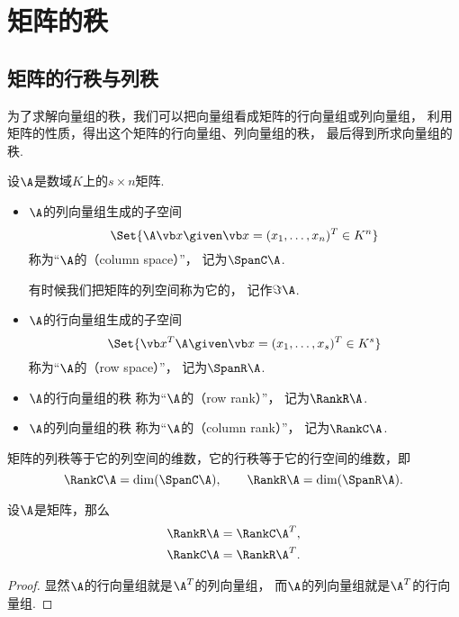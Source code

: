 \section{矩阵的秩}
\subsection{矩阵的行秩与列秩}
为了求解向量组的秩，我们可以把向量组看成矩阵的行向量组或列向量组，
利用矩阵的性质，得出这个矩阵的行向量组、列向量组的秩，
最后得到所求向量组的秩.

\begin{definition}\label{definition:线性方程组.行秩与列秩的定义}
设\(\A\)是数域\(K\)上的\(s \times n\)矩阵.
\begin{itemize}
	\item \(\A\)的列向量组生成的子空间\[
		\Set{
			\A\x \given \x=(x_1,\dotsc,x_n)^T \in K^n
		}
	\]
	称为“\(\A\)的（column space）”，
	记为\(\SpanC\A\).

	有时候我们把矩阵的列空间称为它的，
	记作\(\Im\A\).

	\item \(\A\)的行向量组生成的子空间\[
		\Set{
			\x^T\A \given \x=(x_1,\dotsc,x_s)^T \in K^s
		}
	\]
	称为“\(\A\)的（row space）”，
	记为\(\SpanR\A\).

	\item \(\A\)的行向量组的秩
	称为“\(\A\)的（row rank）”，
	记为\(\RankR\A\).

	\item \(\A\)的列向量组的秩
	称为“\(\A\)的（column rank）”，
	记为\(\RankC\A\).
\end{itemize}
\end{definition}

矩阵的列秩等于它的列空间的维数，它的行秩等于它的行空间的维数，即\[
	\RankC\A=\dim(\SpanC\A), \qquad
	\RankR\A=\dim(\SpanR\A).
\]

\begin{proposition}\label{theorem:向量空间.矩阵的行秩与列秩分别等于它的转置矩阵的列秩与行秩}
设\(\A\)是矩阵，那么\begin{gather}
	\RankR\A=\RankC\A^T, \\
	\RankC\A=\RankR\A^T.
\end{gather}
\begin{proof}
显然\(\A\)的行向量组就是\(\A^T\)的列向量组，
而\(\A\)的列向量组就是\(\A^T\)的行向量组.
\end{proof}
\end{proposition}

